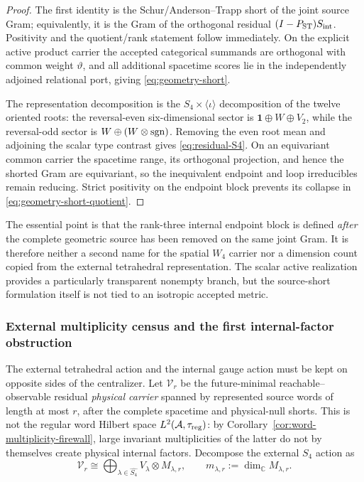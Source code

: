 \documentclass[11pt]{article}
\theoremstyle{definition}
\theoremstyle{remark}
\newcommand{\C}{\mathbb C}
\newcommand{\A}{\mathcal A}
\begin{document}
\begin{proof}
The first identity is the Schur/Anderson--Trapp short of the joint source Gram;
equivalently, it is the Gram of the orthogonal residual
$(I-P_{\rm ST})S_{\rm int}$.  Positivity and the quotient/rank statement follow
immediately.  On the explicit active product carrier the accepted categorical
summands are orthogonal with common weight $\vartheta$, and all additional
spacetime scores lie in the independently adjoined relational port, giving
\eqref{eq:geometry-short}.

The representation decomposition is the
$S_4\times\langle\iota\rangle$ decomposition of the twelve oriented roots:
the reversal-even six-dimensional sector is
$\mathbf1\oplus W\oplus V_2$, while the reversal-odd sector is
$W\oplus(W\otimes{\rm sgn})$.  Removing the even root mean and adjoining the
scalar type contrast gives \eqref{eq:residual-S4}.  On an equivariant common
carrier the spacetime range, its orthogonal projection, and hence the shorted
Gram are equivariant, so the inequivalent endpoint and loop irreducibles remain
reducing.  Strict positivity on the endpoint block prevents its collapse in
\eqref{eq:geometry-short-quotient}.
\end{proof}

The essential point is that the rank-three internal endpoint block is defined
\emph{after} the complete geometric source has been removed on the same joint
Gram.  It is therefore neither a second name for the spatial $W_4$ carrier nor
a dimension count copied from the external tetrahedral representation.  The
scalar active realization provides a particularly transparent nonempty branch,
but the source-short formulation itself is not tied to an isotropic accepted
metric.

\subsubsection{External multiplicity census and the first internal-factor obstruction}
\label{sec:multiplicity-birth}

The external tetrahedral action and the internal gauge action must be kept on
opposite sides of the centralizer.  Let $\mathcal V_r$ be the future-minimal
reachable--observable residual \emph{physical carrier} spanned by represented
source words of length at most $r$, after the complete spacetime and
physical-null shorts.  This is not the regular word Hilbert space
$L^2(\A,\tau_{\rm reg})$: by Corollary~\ref{cor:word-multiplicity-firewall},
large invariant multiplicities of the latter do not by themselves create
physical internal factors.  Decompose the external $S_4$ action as
\begin{equation}
\mathcal V_r
\cong
\bigoplus_{\lambda\in\widehat{S_4}}
V_\lambda\otimes M_{\lambda,r},
\qquad
m_{\lambda,r}:=\dim_\C M_{\lambda,r}.
\label{eq:word-depth-isotypic}
\end{equation}
\end{document}
